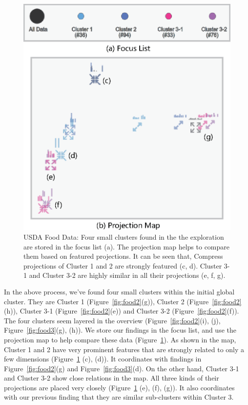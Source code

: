 \begin{figure}[htbp]
\centering
  \includegraphics[width=0.85\linewidth]{images/map_1.eps}%
  \caption{USDA Food Data: Four small clusters found in the the exploration are stored in the focus list (a). The projection map helps to compare them based on featured projections. It can be seen that, Compress projections of Cluster 1 and 2 are strongly featured (c, d). Cluster 3-1 and Cluster 3-2 are highly similar in all their projections (e, f, g).}
\label{fig:map}
  \end{figure}

In the above process, we've found four small clusters within the initial global cluster. They are Cluster 1 (Figure~\ref{fig:food2}(g)), Cluster 2 (Figure~\ref{fig:food2}(h)), Cluster 3-1 (Figure~\ref{fig:food2}(e)) and Cluster 3-2 (Figure~\ref{fig:food2}(f)). The four clusters seem layered in the overview (Figure~\ref{fig:food2}(i), (j), Figure~\ref{fig:food3}(g), (h)). We store our findings in the focus list, and use the projection map to help compare these data (Figure~\ref{fig:map}). As shown in the map, Cluster 1 and 2 have very prominent features that are strongly related to only a few dimensions (Figure~\ref{fig:map} (c), (d)). It coordinates with findings in Figure~\ref{fig:food2}(g) and Figure~\ref{fig:food3}(d). On the other hand, Cluster 3-1 and Cluster 3-2 show close relations in the map. All three kinds of their projections are placed very closely (Figure~\ref{fig:map} (e), (f), (g)). It also coordinates with our previous finding that they are similar sub-clusters within Cluster 3.

